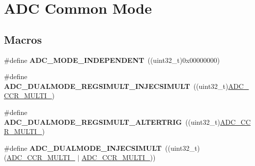 \hypertarget{group___a_d_c_ex___common__mode}{}\section{A\+DC Common Mode}
\label{group___a_d_c_ex___common__mode}
\subsection*{Macros}
\begin{DoxyCompactItemize}
\item 
\#define {\bfseries A\+D\+C\+\_\+\+M\+O\+D\+E\+\_\+\+I\+N\+D\+E\+P\+E\+N\+D\+E\+NT}~((uint32\+\_\+t)0x00000000)\hypertarget{group___a_d_c_ex___common__mode_gaac07297889e931df4083427a99211638}{}\label{group___a_d_c_ex___common__mode_gaac07297889e931df4083427a99211638}

\item 
\#define {\bfseries A\+D\+C\+\_\+\+D\+U\+A\+L\+M\+O\+D\+E\+\_\+\+R\+E\+G\+S\+I\+M\+U\+L\+T\+\_\+\+I\+N\+J\+E\+C\+S\+I\+M\+U\+LT}~((uint32\+\_\+t)\hyperlink{group___peripheral___registers___bits___definition_gae4e7104ce01e3a79b8f6138d87dc3684}{A\+D\+C\+\_\+\+C\+C\+R\+\_\+\+M\+U\+L\+T\+I\+\_})\hypertarget{group___a_d_c_ex___common__mode_gac3ad57b1150ca7862fcc932cf19b2fb0}{}\label{group___a_d_c_ex___common__mode_gac3ad57b1150ca7862fcc932cf19b2fb0}

\item 
\#define {\bfseries A\+D\+C\+\_\+\+D\+U\+A\+L\+M\+O\+D\+E\+\_\+\+R\+E\+G\+S\+I\+M\+U\+L\+T\+\_\+\+A\+L\+T\+E\+R\+T\+R\+IG}~((uint32\+\_\+t)\hyperlink{group___peripheral___registers___bits___definition_ga8781dec7f076b475b85f8470aee94d06}{A\+D\+C\+\_\+\+C\+C\+R\+\_\+\+M\+U\+L\+T\+I\+\_})\hypertarget{group___a_d_c_ex___common__mode_ga2667b75f8acb086aa6ab723466bb3f40}{}\label{group___a_d_c_ex___common__mode_ga2667b75f8acb086aa6ab723466bb3f40}

\item 
\#define {\bfseries A\+D\+C\+\_\+\+D\+U\+A\+L\+M\+O\+D\+E\+\_\+\+I\+N\+J\+E\+C\+S\+I\+M\+U\+LT}~((uint32\+\_\+t)(\hyperlink{group___peripheral___registers___bits___definition_gae6a5be6cff1227431b8d54dffcc1ce88}{A\+D\+C\+\_\+\+C\+C\+R\+\_\+\+M\+U\+L\+T\+I\+\_} $\vert$ \hyperlink{group___peripheral___registers___bits___definition_gae4e7104ce01e3a79b8f6138d87dc3684}{A\+D\+C\+\_\+\+C\+C\+R\+\_\+\+M\+U\+L\+T\+I\+\_}))\hypertarget{group___a_d_c_ex___common__mode_ga8e81364b24ed3c089bb6993b48a020e9}{}\label{group___a_d_c_ex___common__mode_ga8e81364b24ed3c089bb6993b48a020e9}


\end{DoxyCompactItemize}
